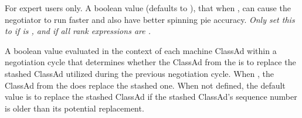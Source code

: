 \begin{description}
\label{param:NegotiatorConsiderPreemption}
\item[\Macro{NEGOTIATOR\_CONSIDER\_PREEMPTION}]
  For expert users only. A boolean value (defaults to ),
  that when ,
  can cause the negotiator to run
  faster and also have better spinning pie accuracy.
  \emph{Only set this to  if 
  is ,
  and if all  rank expressions are .}

\label{param:StartdAdReevalExpr}
\item[\Macro{STARTD\_AD\_REEVAL\_EXPR}]
  A boolean value evaluated in the context of each machine ClassAd within
  a negotiation cycle that determines whether the ClassAd from the
   is to replace the stashed ClassAd utilized during
  the previous negotiation cycle.
  When ,
  the ClassAd from the  does replace the stashed one.
  When not defined, the default value is to replace the stashed ClassAd
  if the stashed ClassAd's sequence number is older than its potential
  replacement.

\end{description}


% 
  


